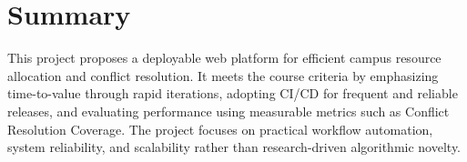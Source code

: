 \documentclass[11pt,a4paper]{article}
\begin{document}
\section{Summary}
This project proposes a deployable web platform for efficient campus resource allocation and conflict resolution. It meets the course criteria by emphasizing time-to-value through rapid iterations, adopting CI/CD for frequent and reliable releases, and evaluating performance using measurable metrics such as Conflict Resolution Coverage. The project focuses on practical workflow automation, system reliability, and scalability rather than research-driven algorithmic novelty.
\end{document}
